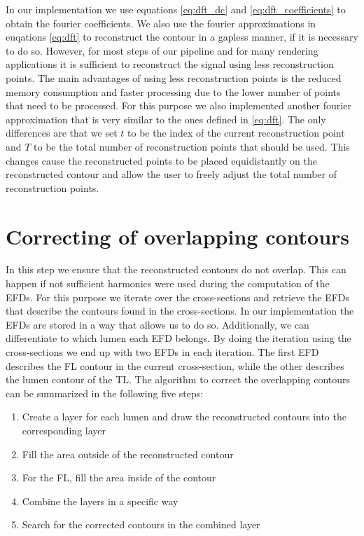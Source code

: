 \documentclass[thesis.tex]{subfiles}
\begin{document}
In our implementation we use equations \ref{eq:dft_dc} and \ref{eq:dft_coefficients} to obtain the fourier coefficients. We also use the fourier approximations in euqations \ref{eq:dft} to reconstruct the contour in a gapless manner, if it is necessary to do so. However, for most steps of our pipeline and for many rendering applications it is sufficient to reconstruct the signal using less reconstruction points. The main advantages of using less reconstruction points is the reduced memory consumption and faster processing due to the lower number of points that need to be processed. For this purpose we also implemented another fourier approximation that is very similar to the ones defined in \ref{eq:dft}. The only differences are that we set $t$ to be the index of the current reconstruction point and $T$ to be the total number of reconstruction points that should be used. This changes cause the reconstructed points to be placed equidistantly on the reconstructed contour and allow the user to freely adjust the total number of reconstruction points.\\ 

\section{Correcting of overlapping contours}
In this step we ensure that the reconstructed contours do not overlap. This can happen if not sufficient harmonics were used during the computation of the EFDs. For this purpose we iterate over the cross-sections and retrieve the EFDs that describe the contours found in the cross-sections. In our implementation the EFDs are stored in a way that allows us to do so. Additionally, we can differentiate to which lumen each EFD belongs. By doing the iteration using the cross-sections we end up with two EFDs in each iteration. The first EFD describes the FL contour in the current cross-section, while the other describes the lumen contour of the TL. 
The algorithm to correct the overlapping contours can be summarized in the following five steps:

\begin{enumerate}
\item Create a layer for each lumen and draw the reconstructed contours into the corresponding layer
\item Fill the area outside of the reconstructed contour
\item For the FL, fill the area inside of the contour
\item Combine the layers in a specific way
\item Search for the corrected contours in the combined layer
\end{enumerate}
\end{document}

